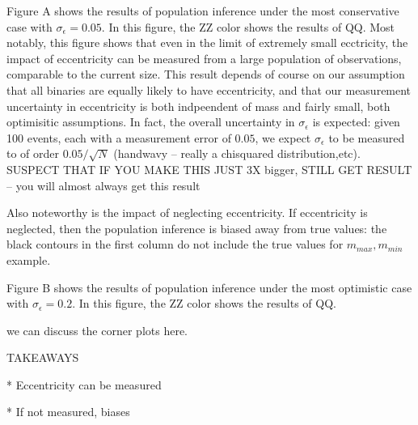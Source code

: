 \documentclass[twocolumn,prd,nofootinbib]{revtex4}
\begin{document}
Figure A shows the results of population inference under the most conservative case with $\sigma_\epsilon=0.05$.  In this figure, the ZZ color shows the results of QQ.
%
Most notably, this figure shows that even in the limit of extremely small ecctricity, the impact of eccentricity can be measured from a large population of observations, comparable to the current size.  This result depends of course on our assumption that all binaries are equally likely to have eccentricity, and that our measurement uncertainty in eccentricity is both indpeendent of mass and fairly small, both optimisitic assumptions.  In fact, the overall uncertainty in $\sigma_\epsilon$ is expected: given 100 events, each with a measurement error of $0.05$, we expect $\sigma_\epsilon$ to be measured to of order $0.05/\sqrt{N}$ (handwavy -- really a chisquared distribution,etc).
SUSPECT THAT IF YOU MAKE THIS JUST 3X bigger, STILL GET RESULT -- you will almost always get this result

Also noteworthy is the impact of neglecting eccentricity.  If eccentricity is neglected, then the population inference is biased away from true values: the black contours in the first column do not include the true values for $m_{max}, m_{min}$ example.



Figure B shows the results of population inference under the most optimistic case with $\sigma_\epsilon=0.2$.  In this figure, the ZZ color shows the results of QQ.


we can discuss the corner plots here.

TAKEAWAYS

* Eccentricity can be measured

* If not measured, biases
\end{document}
